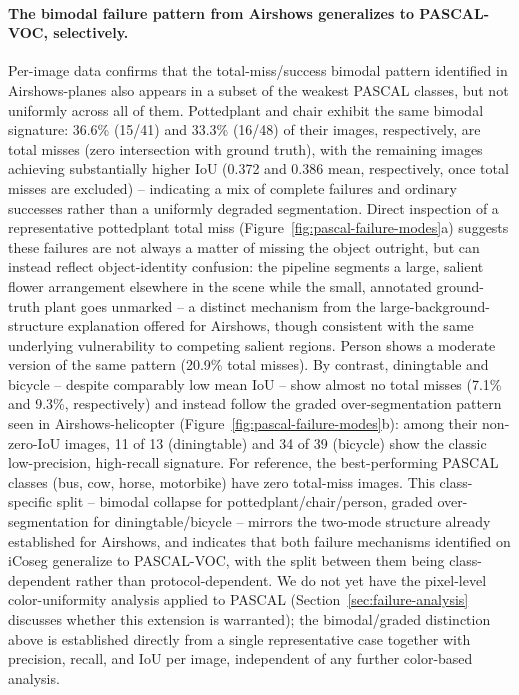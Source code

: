 \paragraph{The bimodal failure pattern from Airshows generalizes to PASCAL-VOC, selectively.} Per-image data confirms that the total-miss/success bimodal pattern identified in Airshows-planes also appears in a subset of the weakest PASCAL classes, but not uniformly across all of them. Pottedplant and chair exhibit the same bimodal signature: 36.6\% (15/41) and 33.3\% (16/48) of their images, respectively, are total misses (zero intersection with ground truth), with the remaining images achieving substantially higher IoU (0.372 and 0.386 mean, respectively, once total misses are excluded) -- indicating a mix of complete failures and ordinary successes rather than a uniformly degraded segmentation. Direct inspection of a representative pottedplant total miss (Figure~\ref{fig:pascal-failure-modes}a) suggests these failures are not always a matter of missing the object outright, but can instead reflect object-identity confusion: the pipeline segments a large, salient flower arrangement elsewhere in the scene while the small, annotated ground-truth plant goes unmarked -- a distinct mechanism from the large-background-structure explanation offered for Airshows, though consistent with the same underlying vulnerability to competing salient regions. Person shows a moderate version of the same pattern (20.9\% total misses). By contrast, diningtable and bicycle -- despite comparably low mean IoU -- show almost no total misses (7.1\% and 9.3\%, respectively) and instead follow the graded over-segmentation pattern seen in Airshows-helicopter (Figure~\ref{fig:pascal-failure-modes}b): among their non-zero-IoU images, 11 of 13 (diningtable) and 34 of 39 (bicycle) show the classic low-precision, high-recall signature. For reference, the best-performing PASCAL classes (bus, cow, horse, motorbike) have zero total-miss images. This class-specific split -- bimodal collapse for pottedplant/chair/person, graded over-segmentation for diningtable/bicycle -- mirrors the two-mode structure already established for Airshows, and indicates that both failure mechanisms identified on iCoseg generalize to PASCAL-VOC, with the split between them being class-dependent rather than protocol-dependent. We do not yet have the pixel-level color-uniformity analysis applied to PASCAL (Section~\ref{sec:failure-analysis} discusses whether this extension is warranted); the bimodal/graded distinction above is established directly from a single representative case together with precision, recall, and IoU per image, independent of any further color-based analysis.

